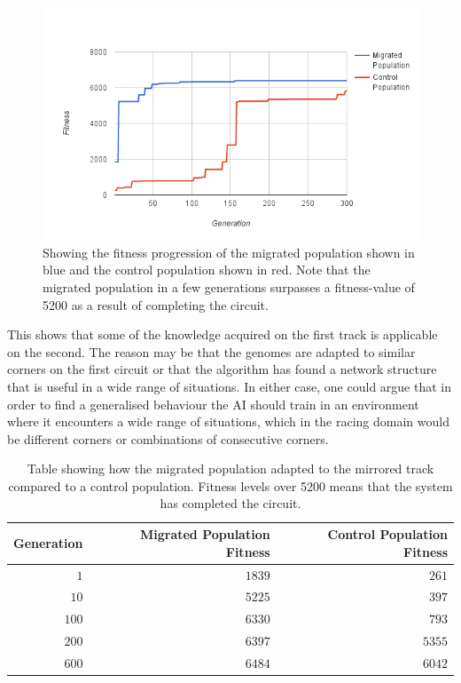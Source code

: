 \begin{figure}[H]
\includegraphics[width=\textwidth]{report/images/graphs/mirror_migration}
\centering
\caption{Showing the fitness progression of the migrated population shown in blue and the control population shown in red. Note that the migrated population in a few generations surpasses a fitness-value of 5200 as a result of completing the circuit.}
\label{fig:mirrordata}
\end{figure}

\noindent
This shows that some of the knowledge acquired on the first track is applicable on the second. The reason may be that the genomes are adapted to similar corners on the first circuit or that the algorithm has found a network structure that is useful in a wide range of situations. In either case, one could argue that in order to find a generalised behaviour the AI should train in an environment where it encounters a wide range of situations, which in the racing domain would be different corners or combinations of consecutive corners. 

\begin{table}[H] 
  \centering
  \begin{tabular}{|r|r|r|}
    \toprule
    Generation & Migrated Population Fitness & Control Population Fitness\\
    \midrule
    $1$     & $1839$ & $261$    \\
    $10$    & $5225$ & $397$    \\
    $100$   & $6330$ & $793$    \\
    $200$   & $6397$ & $5355$   \\
    $600$   & $6484$ & $6042$   \\
    \bottomrule
  \end{tabular}
  \caption{Table showing how the migrated population adapted to the mirrored track compared to a control population. Fitness levels over 5200 means that the system has completed the circuit.}
  \label{tab:mirrored}
\end{table}

